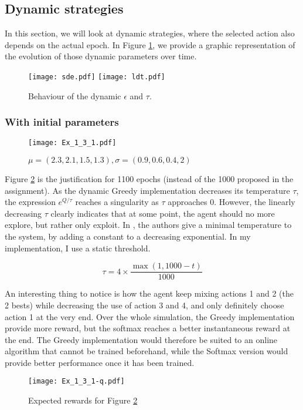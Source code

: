 \documentclass[a4paper,11pt]{article}
\begin{document}
\subsection{Dynamic strategies}
In this section, we will look at dynamic strategies, where the selected action also depends on the actual epoch. In Figure \ref{fig:timevar}, we provide a graphic representation of the evolution of those dynamic parameters over time.

\begin{figure}[H]
  \center
  \texttt{[image: sde.pdf]}
  \texttt{[image: ldt.pdf]}
  \caption{\label{fig:timevar} Behaviour of the dynamic $\epsilon$ and $\tau$.}
\end{figure}

\subsubsection{With initial parameters}
\begin{figure}[H]
  \center
  \texttt{[image: Ex\_1\_3\_1.pdf]}
  \caption{\label{fig:1.3.1} $\mu = (2.3, 2.1, 1.5, 1.3), \sigma = (0.9, 0.6, 0.4, 2)$}
\end{figure}

Figure \ref{fig:1.3.1} is the justification for 1100 epochs (instead of the 1000 proposed in the assignment). As the dynamic Greedy implementation decreases its temperature $\tau$, the expression $e^{Q/\tau}$ reaches a singularity as $\tau$ approaches 0. However, the linearly decreasing $\tau$ clearly indicates that at some point, the agent should no more explore, but rather only exploit. In \cite{Kapetanakis2005}, the authors give a minimal temperature to the system, by adding a constant to a decreasing exponential. In my implementation, I use a static threshold.

$$ \tau = 4 \times \frac{\max(1, 1000-t)}{1000} $$

An interesting thing to notice is how the agent keep mixing actions 1 and 2 (the 2 bests) while decreasing the use of action 3 and 4, and only definitely choose action 1 at the very end. Over the whole simulation, the Greedy implementation provide more reward, but the softmax reaches a better instantaneous reward at the end. The Greedy implementation would therefore be suited to an online algorithm that cannot be trained beforehand, while the Softmax version would provide better performance once it has been trained.

\begin{figure}[H]
  \center
  \texttt{[image: Ex\_1\_3\_1-q.pdf]}
  \caption{\label{fig:1.3.1q} Expected rewards for Figure \ref{fig:1.3.1}}
\end{figure}
\end{document}
